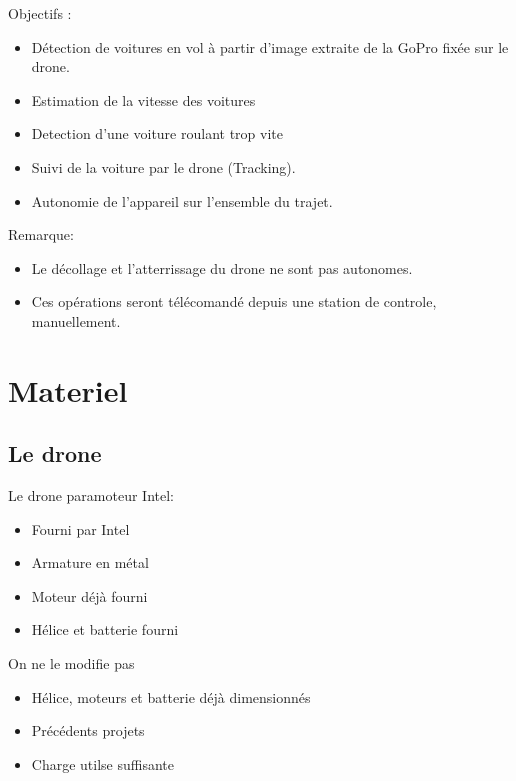 \documentclass[transparent]{beamer}
\begin{document}
\begin{frame}
	\begin{block}{Objectifs :}
			\begin{itemize}
				\item Détection de voitures en vol à partir d’image extraite de la GoPro fixée sur le drone.
				\item Estimation de la vitesse des voitures
				\item Detection d'une voiture roulant trop vite
				\item Suivi de la voiture par le drone (Tracking).
				\item Autonomie de l'appareil sur l'ensemble du trajet.
			\end{itemize}
	\end{block}
	\begin{block}{Remarque:}
			\begin{itemize}
				\item Le décollage et l’atterrissage du drone ne sont pas autonomes.
				\item Ces opérations seront télécomandé depuis une station de controle, manuellement.
			\end{itemize}
	\end{block}
\end{frame}

\section{Materiel}
\subsection{Le drone}

\begin{frame}
	\begin{block}{Le drone paramoteur Intel:}
			\begin{itemize}
				\item Fourni par Intel
				\item Armature en métal
				\item Moteur déjà fourni
				\item Hélice et batterie fourni
			\end{itemize}
	\end{block}
	\begin{block}{On ne le modifie pas}
			\begin{itemize}
				\item Hélice, moteurs et batterie déjà dimensionnés
				\item Précédents projets
				\item Charge utilse suffisante
			\end{itemize}
	\end{block}
\end{frame}
\end{document}
